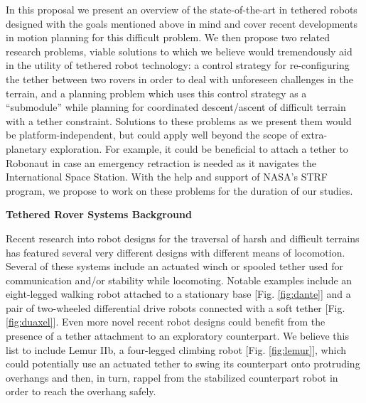 \documentclass[12pt]{article}
\begin{document}
In this proposal we present an overview of the state-of-the-art in tethered robots designed with the goals 
mentioned above in mind and cover recent developments in motion planning for this difficult problem. 
We then propose two related research problems, viable solutions to which we believe would tremendously aid 
in the utility of tethered robot technology: a control strategy for re-configuring the tether between two 
rovers in order to deal with unforeseen challenges in the terrain, and a planning problem which uses this 
control strategy as a ``submodule'' while planning for coordinated descent/ascent of difficult terrain with 
a tether constraint. Solutions to these problems as we present them would be platform-independent, but could 
apply well beyond the scope of extra-planetary exploration. For example, it could be beneficial to attach a 
tether to Robonaut in case an emergency retraction is needed as it navigates the International Space Station. 
With the help and support of NASA's STRF program, we propose to work on these problems for the duration of our 
studies. 



{\bf\noindent Tethered Rover Systems Background}

Recent research into robot designs for the traversal of harsh and difficult terrains 
has featured several very different designs with different means of locomotion. Several of these systems 
include an actuated winch or spooled tether used for communication and/or stability while locomoting. 
Notable examples include an eight-legged walking robot attached to a stationary base [Fig. \ref{fig:dante}] and a pair of 
two-wheeled differential drive robots connected with a soft tether [Fig. \ref{fig:duaxel}]. Even more novel recent 
robot designs could benefit from the presence of a tether attachment to an exploratory counterpart. We believe 
this list to include Lemur IIb, a four-legged climbing robot [Fig. \ref{fig:lemur}], which could potentially use an actuated 
tether to swing its counterpart onto protruding overhangs and then, in turn, rappel from the stabilized counterpart robot 
in order to reach the overhang safely.
\end{document}
